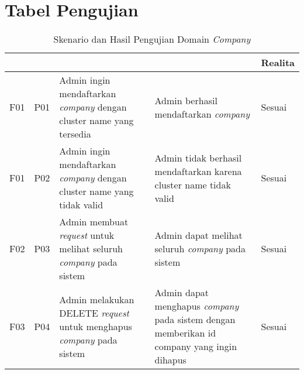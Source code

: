 \chapter{Tabel Pengujian}

\bgroup
\begin{table}[ht]
  \def\arraystretch{1.5}
  \caption{Skenario dan Hasil Pengujian Domain \textit{Company}}
  \label{tab:pengujian-domain-company}
  \centering
  \begin{tabular}{|p{2cm}|p{2cm}|p{3cm}|p{3cm}|p{1.5cm}|}
    \hline
    \centering{ID Fungsional} & \centering{ID Pengujian} & \centering{Skenario}                                                                 & \centering{Ekspektasi}                                                                             & Realita \\
    \hline
    F01                       & P01                      & Admin ingin mendaftarkan \textit{company} dengan cluster name yang tersedia          & Admin berhasil mendaftarkan \textit{company}                                                       & Sesuai  \\
    \hline
    F01                       & P02                      & Admin ingin mendaftarkan \textit{company} dengan cluster name yang tidak valid       & Admin tidak berhasil mendaftarkan karena cluster name tidak valid                                  & Sesuai  \\
    \hline
    F02                       & P03                      & Admin membuat \textit{request} untuk melihat seluruh \textit{company} pada sistem    & Admin dapat melihat seluruh \textit{company} pada sistem                                           & Sesuai  \\
    \hline
    F03                       & P04                      & Admin melakukan DELETE \textit{request} untuk menghapus \textit{company} pada sistem & Admin dapat menghapus \textit{company} pada sistem dengan memberikan id company yang ingin dihapus & Sesuai  \\
    \hline
  \end{tabular}
\end{table}
\egroup


